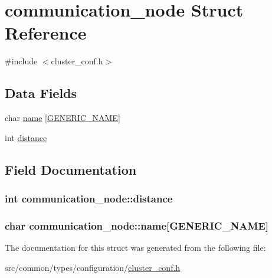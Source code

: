 \hypertarget{structcommunication__node}{}\section{communication\+\_\+node Struct Reference}
\label{structcommunication__node}


{\ttfamily \#include $<$cluster\+\_\+conf.\+h$>$}

\subsection*{Data Fields}
\begin{DoxyCompactItemize}
\item 
char \hyperlink{structcommunication__node_adb14ea0bf22dd23c35eeecf2ee0036cd}{name} \mbox{[}\hyperlink{loop_8h_a6b0b8b14cfc75447be8feba3efe18da8}{G\+E\+N\+E\+R\+I\+C\+\_\+\+N\+A\+ME}\mbox{]}
\item 
int \hyperlink{structcommunication__node_a7a4e763cfece17e51e368acbe7e2ca2f}{distance}
\end{DoxyCompactItemize}


\subsection{Field Documentation}
\subsubsection[{\texorpdfstring{distance}{distance}}]{\setlength{\rightskip}{0pt plus 5cm}int communication\+\_\+node\+::distance}\hypertarget{structcommunication__node_a7a4e763cfece17e51e368acbe7e2ca2f}{}\label{structcommunication__node_a7a4e763cfece17e51e368acbe7e2ca2f}
\subsubsection[{\texorpdfstring{name}{name}}]{\setlength{\rightskip}{0pt plus 5cm}char communication\+\_\+node\+::name\mbox{[}{\bf G\+E\+N\+E\+R\+I\+C\+\_\+\+N\+A\+ME}\mbox{]}}\hypertarget{structcommunication__node_adb14ea0bf22dd23c35eeecf2ee0036cd}{}\label{structcommunication__node_adb14ea0bf22dd23c35eeecf2ee0036cd}


The documentation for this struct was generated from the following file\+:\begin{DoxyCompactItemize}
\item 
src/common/types/configuration/\hyperlink{cluster__conf_8h}{cluster\+\_\+conf.\+h}\end{DoxyCompactItemize}
